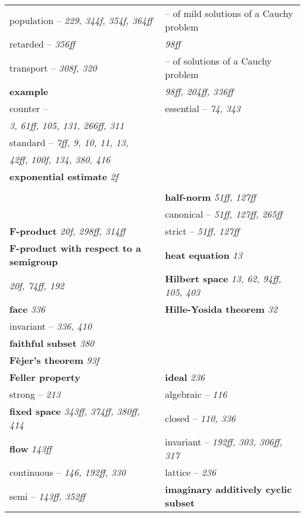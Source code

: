 \documentclass{article}
\begin{document}
\begin{longtable}{p{}p{}}
\quad population -- \textit{229, 344f, 354f, 364ff} & \quad -- of mild solutions of a Cauchy problem \\
\quad retarded -- \textit{356ff} & \quad\quad \textit{98ff} \\
\quad transport -- \textit{308f, 320} & \quad -- of solutions of a Cauchy problem \\
\textbf{example} & \quad\quad \textit{98ff, 204ff, 336ff} \\
\quad counter -- & \quad essential -- \textit{74, 343} \\
\quad\quad \textit{3, 61ff, 105, 131, 266ff, 311} & \\
\quad standard -- \textit{7ff, 9, 10, 11, 13,} & \\
\quad\quad \textit{42ff, 100f, 134, 380, 416} & \\
\textbf{exponential estimate} \textit{2f} & \\
& \\
& \textbf{half-norm} \textit{51ff, 127ff} \\
& \quad canonical -- \textit{51ff, 127ff, 265ff} \\
\textbf{F-product} \textit{20f, 298ff, 314ff} & \quad strict -- \textit{51ff, 127ff} \\
\textbf{F-product with respect to a semigroup} & \textbf{heat equation} \textit{13} \\
\quad \textit{20f, 74ff, 192} & \textbf{Hilbert space} \textit{13, 62, 94ff, 105, 403} \\
\textbf{face} \textit{336} & \textbf{Hille-Yosida theorem} \textit{32} \\
\quad invariant -- \textit{336, 410} & \\
\textbf{faithful subset} \textit{380} & \\
\textbf{Fèjer's theorem} \textit{93f} & \\
\textbf{Feller property} & \textbf{ideal} \textit{236} \\
\quad strong -- \textit{213} & \quad algebraic -- \textit{116} \\
\textbf{fixed space} \textit{343ff, 374ff, 380ff, 414} & \quad closed -- \textit{110, 336} \\
\textbf{flow} \textit{143ff} & \quad invariant -- \textit{192ff, 303, 306ff, 317} \\
\quad continuous -- \textit{146, 192ff, 330} & \quad lattice -- \textit{236} \\
\quad semi -- \textit{143ff, 352ff} & \textbf{imaginary additively cyclic subset} \\

\end{longtable}
\end{document}
